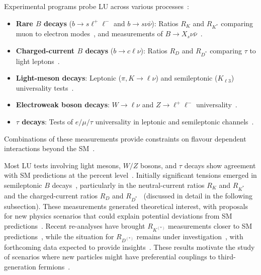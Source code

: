Experimental programs probe LU across various processes~\cite{1674-1137-40-10-100001}:
\begin{itemize}
  \item \textbf{Rare $B$ decays} ($b\to s\ell^+\ell^-$ and $b\to s\nu\bar{\nu}$): Ratios $R_K$ and $R_{K^*}$ comparing muon to electron modes~\cite{LHCb:2014vgu,LHCb:2017avl,LHCb:2019hip,LHCb:2021trn,LHCb:2022qnv,LHCb:2022zom,Hiller:2014yaa}, and measurements of $B \to X_s \nu\bar{\nu}$~\cite{Belle-II:2025bho}.
  \item \textbf{Charged-current $B$ decays} ($b\to c\ell\nu$): Ratios $R_D$ and $R_{D^*}$ comparing $\tau$ to light leptons~\cite{BaBar:2012obs,BaBar:2013mob,Belle:2015qfa,LHCb:2015gmp,LHCb:2017rln,LHCb:2023zxo,Amhis_2021}.
  \item \textbf{Light-meson decays}: Leptonic ($\pi, K\to \ell\nu$) and semileptonic ($K_{\ell3}$) universality tests~\cite{1674-1137-40-10-100001,Antonelli:2010}.
  \item \textbf{Electroweak boson decays}: $W\to \ell\nu$ and $Z\to \ell^+\ell^-$ universality~\cite{atlas2020test,LEPEW:2006}.
  \item \textbf{$\tau$ decays}: Tests of $e/\mu/\tau$ universality in leptonic and semileptonic channels~\cite{1674-1137-40-10-100001,Amhis_2021}.
\end{itemize}
Combinations of these measurements provide constraints on flavour dependent interactions beyond the SM~\parencite{1674-1137-40-10-100001}.

Most LU tests involving light mesons, $W/Z$ bosons, and $\tau$ decays show agreement with SM predictions at the percent level~\parencite{1674-1137-40-10-100001}. Initially significant tensions emerged in semileptonic $B$ decays~\cite{Hiller:2014yaa,Buttazzo:2017ixm,Capdevila_2018,Alonso:2015sja,Calibbi:2015kma}, particularly in the neutral-current ratios $R_K$ and $R_{K^*}$~\cite{LHCb:2014vgu,LHCb:2017avl,LHCb:2019hip,LHCb:2021trn,Altmannshofer_2015} and the charged-current ratios $R_D$ and $R_{D^*}$~\cite{BaBar:2012obs,BaBar:2013mob,Belle:2015qfa,Abdesselam:2019dgh,Hirose:2017dxl,Sato:2016svk,Hirose:2016wfn,Huschle:2015rga,LHCb:2015gmp,Aaij:2015yra,Aaij:2017uff,LHCb:2017rln,LHCb:2023zxo,Amhis_2021} (discussed in detail in the following subsection). These measurements generated theoretical interest, with proposals for new physics scenarios that could explain potential deviations from SM predictions~\cite{Dorsner:2016wpm,Angelescu:2018tyl,Bauer:2015knc,Crivellin:2017zlb}. Recent re-analyses have brought $R_{K^{(*)}}$ measurements closer to SM predictions~\parencite{LHCb:2022qnv,LHCb:2022zom,Greljo:2022jac,Ciuchini:2022wbq}, while the situation for $R_{D^{(*)}}$ remains under investigation~\cite{Amhis_2021}, with forthcoming data expected to provide insights~\cite{Belle-II:2018jsg}. These results motivate the study of scenarios where new particles might have preferential couplings to third-generation fermions~\cite{Greljo:2018tuh,King:2021jeo,Cornella:2019hct,Cornella:2021sby}.

